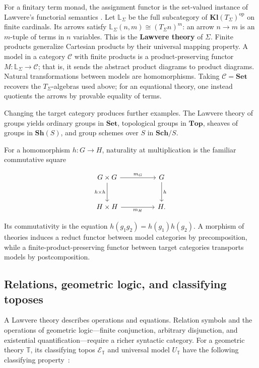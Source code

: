 \documentclass[11pt]{article}
\theoremstyle{definition}
\begin{document}
For a finitary term monad, the assignment functor is the set-valued instance of
Lawvere's functorial semantics \cite{Lawvere1963}. Let \(\mathbb L_\Sigma\) be the full
subcategory of \(\mathbf{Kl}(T_\Sigma)^{\mathrm{op}}\) on finite cardinals.
Its arrows satisfy
\(\mathbb L_\Sigma(n,m)\cong(T_\Sigma n)^m\): an arrow \(n\to m\) is an
\(m\)-tuple of terms in \(n\) variables. This is the \textbf{Lawvere theory}
of \(\Sigma\). Finite products generalize Cartesian products by their universal
mapping property. A model in a category \(\mathcal C\) with finite products is
a product-preserving functor \(M:\mathbb L_\Sigma\to\mathcal C\); that is, it
sends the abstract product diagrams to product diagrams. Natural
transformations between models are homomorphisms. Taking
\(\mathcal C=\mathbf{Set}\) recovers the \(T_\Sigma\)-algebras used above;
for an equational theory, one instead quotients the arrows by provable equality
of terms.

Changing the target category produces further examples. The Lawvere
theory of groups yields ordinary groups in \(\mathbf{Set}\), topological
groups in \(\mathbf{Top}\), sheaves of groups in \(\mathbf{Sh}(S)\), and
group schemes over \(S\) in \(\mathbf{Sch}/S\).

For a homomorphism
\(h:G\to H\), naturality at multiplication is the familiar commutative
square

\[
\begin{tikzcd}[row sep=large,column sep=huge]
G\times G \arrow[r,"m_G"] \arrow[d,"h\times h"'] &
G \arrow[d,"h"] \\
H\times H \arrow[r,"m_H"'] & H .
\end{tikzcd}
\]

Its commutativity is the equation \(h(g_1g_2)=h(g_1)h(g_2)\). A morphism
of theories induces a reduct functor between model categories by
precomposition, while a finite-product-preserving functor between target
categories transports models by postcomposition.

\subsection{Relations, geometric logic, and classifying toposes}

A Lawvere theory describes operations and equations. Relation symbols and the
operations of geometric logic---finite conjunction, arbitrary disjunction,
and existential quantification---require a richer syntactic category. For a
geometric theory \(\mathbb T\), its classifying topos
\(\mathcal E_{\mathbb T}\) and universal model \(U_{\mathbb T}\) have the
following classifying property~\cite[pp.~3--5]{CaramelloClassifying}:
\end{document}
